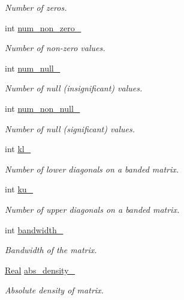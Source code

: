 \begin{DoxyCompactItemize}
\begin{DoxyCompactList}\small\item\em Number of zeros. \end{DoxyCompactList}\item 
int \hyperlink{classmtk_1_1Matrix_a064d611ebb949858441180d6ff2acaee}{num\+\_\+non\+\_\+zero\+\_\+}
\begin{DoxyCompactList}\small\item\em Number of non-\/zero values. \end{DoxyCompactList}\item 
int \hyperlink{classmtk_1_1Matrix_aec5bf3cd2e62d7a38412e1dca35cf822}{num\+\_\+null\+\_\+}
\begin{DoxyCompactList}\small\item\em Number of null (insignificant) values. \end{DoxyCompactList}\item 
int \hyperlink{classmtk_1_1Matrix_a32d782bd784bea3bb3e5fd55a583b4b7}{num\+\_\+non\+\_\+null\+\_\+}
\begin{DoxyCompactList}\small\item\em Number of null (significant) values. \end{DoxyCompactList}\item 
int \hyperlink{classmtk_1_1Matrix_a45c2498d0b6d515c72c2e631508acd7d}{kl\+\_\+}
\begin{DoxyCompactList}\small\item\em Number of lower diagonals on a banded matrix. \end{DoxyCompactList}\item 
int \hyperlink{classmtk_1_1Matrix_afdb4436c4c4c6deaed608a06026179c9}{ku\+\_\+}
\begin{DoxyCompactList}\small\item\em Number of upper diagonals on a banded matrix. \end{DoxyCompactList}\item 
int \hyperlink{classmtk_1_1Matrix_a892449ddacb81d089818967e65979786}{bandwidth\+\_\+}
\begin{DoxyCompactList}\small\item\em Bandwidth of the matrix. \end{DoxyCompactList}\item 
\hyperlink{group__c01-roots_gac080bbbf5cbb5502c9f00405f894857d}{Real} \hyperlink{classmtk_1_1Matrix_abdf2ac1bbb6c4432cb7caf06e4ca0f26}{abs\+\_\+density\+\_\+}
\begin{DoxyCompactList}\small\item\em Absolute density of matrix. \end{DoxyCompactList}\item 

\end{DoxyCompactItemize}
